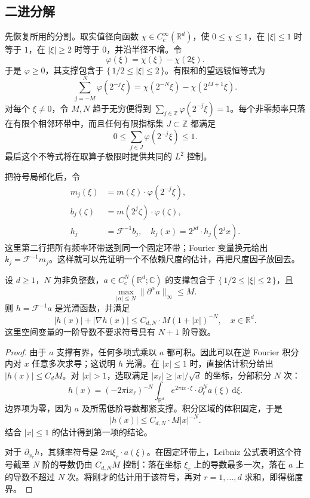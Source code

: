 \subsection{二进分解}
\label{b2:subsec:220202}

先恢复所用的分割。取实值径向函数 \(\chi\in C_c^\infty(\mathbb R^d)\)，使 \(0\leq\chi\leq1\)，在 \(|\xi|\leq1\) 时等于 \(1\)，在 \(|\xi|\geq2\) 时等于 \(0\)，并沿半径不增。令
\[
 \varphi(\xi)=\chi(\xi)-\chi(2\xi).
\]
于是 \(\varphi\geq0\)，其支撑包含于 \(\{\,1/2\leq|\xi|\leq2\,\}\)。有限和的望远镜恒等式为
\[
 \sum_{j=-M}^{N}\varphi(2^{-j}\xi)
 =\chi(2^{-N}\xi)-\chi(2^{M+1}\xi).
\]
对每个 \(\xi\ne0\)，令 \(M,N\) 趋于无穷便得到 \(\sum_{j\in\mathbb Z}\varphi(2^{-j}\xi)=1\)。每个非零频率只落在有限个相邻环带中，而且任何有限指标集 \(J\subset\mathbb Z\) 都满足
\[
 0\leq\sum_{j\in J}\varphi(2^{-j}\xi)\leq1.
\]
最后这个不等式将在取算子极限时提供共同的 \(L^2\) 控制。

\ProseParagraphBreak
把符号局部化后，令
\[
 \begin{aligned}
  m_j(\xi)&=m(\xi)\cdot\varphi(2^{-j}\xi),\\
  b_j(\zeta)&=m(2^j\zeta)\cdot\varphi(\zeta),\\
  h_j&=\mathcal F^{-1}b_j,\quad
  k_j(x)=2^{jd}\cdot h_j(2^jx).
 \end{aligned}
\]
这里第二行把所有频率环带送到同一个固定环带；Fourier 变量换元给出 \(k_j=\mathcal F^{-1}m_j\)。这样就可以先证明一个不依赖尺度的估计，再把尺度因子放回去。

\begin{lemma}[固定环带上的有限导数核估计]\label{b2:lem:22-annular-kernel}
设 \(d\geq1\)，\(N\) 为非负整数，\(a\in C_c^N(\mathbb R^d;\mathbb C)\) 的支撑包含于 \(\{\,1/2\leq|\xi|\leq2\,\}\)，且
\[
 \max_{|\alpha|\leq N}\|\partial^\alpha a\|_\infty\leq M.
\]
则 \(h=\mathcal F^{-1}a\) 是光滑函数，并满足
\[
 |h(x)|+|\nabla h(x)|
 \leq C_{d,N}\cdot M(1+|x|)^{-N},
 \quad x\in\mathbb R^d.
\]
这里空间变量的一阶导数不要求符号具有 \(N+1\) 阶导数。
\end{lemma}
\begin{proof}
由于 \(a\) 支撑有界，任何多项式乘以 \(a\) 都可积。因此可以在逆 Fourier 积分内对 \(x\) 任意多次求导；这说明 \(h\) 光滑。在 \(|x|\leq1\) 时，直接估计积分给出 \(|h(x)|\leq C_dM\)。对 \(|x|>1\)，选取满足 \(|x_\ell|\geq|x|/\sqrt d\) 的坐标，分部积分 \(N\) 次：
\[
 h(x)=(-2\pi\mathrm i x_\ell)^{-N}
 \int_{\mathbb R^d}e^{2\pi\mathrm i x\cdot\xi}
 \cdot\partial_\ell^Na(\xi)\,\mathrm d\xi.
\]
边界项为零，因为 \(a\) 及所需低阶导数都紧支撑。积分区域的体积固定，于是
\[
 |h(x)|\leq C_{d,N}\cdot M|x|^{-N}.
\]
结合 \(|x|\leq1\) 的估计得到第一项的结论。

对于 \(\partial_{x_r}h\)，其频率符号是 \(2\pi\mathrm i\xi_r\cdot a(\xi)\)。在固定环带上，Leibniz 公式表明这个符号截至 \(N\) 阶的导数仍由 \(C_{d,N}M\) 控制：落在坐标 \(\xi_r\) 上的导数最多一次，落在 \(a\) 上的导数不超过 \(N\) 次。将刚才的估计用于该符号，再对 \(r=1,\ldots,d\) 求和，即得梯度界。
\end{proof}

